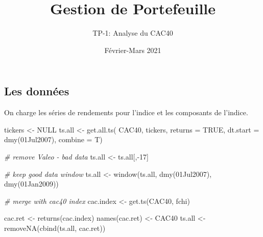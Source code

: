 \documentclass[
]{article}
\title{Gestion de Portefeuille}
\subtitle{TP-1: Analyse du CAC40}
\author{}
\date{\vspace{-2.5em}Février-Mars 2021}
\newenvironment{Shaded}{\begin{snugshade}}{\end{snugshade}}
\newcommand{\AttributeTok}[1]{\textcolor[rgb]{0.77,0.63,0.00}{#1}}
\newcommand{\CommentTok}[1]{\textcolor[rgb]{0.56,0.35,0.01}{\textit{#1}}}
\newcommand{\ConstantTok}[1]{\textcolor[rgb]{0.00,0.00,0.00}{#1}}
\newcommand{\DecValTok}[1]{\textcolor[rgb]{0.00,0.00,0.81}{#1}}
\newcommand{\FunctionTok}[1]{\textcolor[rgb]{0.00,0.00,0.00}{#1}}
\newcommand{\NormalTok}[1]{#1}
\newcommand{\OtherTok}[1]{\textcolor[rgb]{0.56,0.35,0.01}{#1}}
\newcommand{\SpecialCharTok}[1]{\textcolor[rgb]{0.00,0.00,0.00}{#1}}
\newcommand{\StringTok}[1]{\textcolor[rgb]{0.31,0.60,0.02}{#1}}
\begin{document}
\maketitle

\hypertarget{les-donnuxe9es}{%
\subsection{Les données}\label{les-donnuxe9es}}

On charge les séries de rendements pour l'indice et les composants de
l'indice.

\begin{Shaded}
\begin{Highlighting}[]
\NormalTok{tickers }\OtherTok{\textless{}{-}} \ConstantTok{NULL}
\NormalTok{  ts.all }\OtherTok{\textless{}{-}} \FunctionTok{get.all.ts}\NormalTok{(}
    \StringTok{\textquotesingle{}CAC40\textquotesingle{}}\NormalTok{, tickers, }\AttributeTok{returns =} \ConstantTok{TRUE}\NormalTok{,}
    \AttributeTok{dt.start =} \FunctionTok{dmy}\NormalTok{(}\StringTok{\textquotesingle{}01Jul2007\textquotesingle{}}\NormalTok{), }\AttributeTok{combine =}\NormalTok{ T)}
  
  \CommentTok{\# remove Valeo {-} bad data}
\NormalTok{  ts.all }\OtherTok{\textless{}{-}}\NormalTok{ ts.all[,}\SpecialCharTok{{-}}\DecValTok{17}\NormalTok{]}
  
  \CommentTok{\# keep good data window}
\NormalTok{  ts.all }\OtherTok{\textless{}{-}} \FunctionTok{window}\NormalTok{(ts.all, }\FunctionTok{dmy}\NormalTok{(}\StringTok{\textquotesingle{}01Jul2007\textquotesingle{}}\NormalTok{), }
                   \FunctionTok{dmy}\NormalTok{(}\StringTok{\textquotesingle{}01Jan2009\textquotesingle{}}\NormalTok{))}
  
  \CommentTok{\# merge with cac40 index}
\NormalTok{  cac.index }\OtherTok{\textless{}{-}} \FunctionTok{get.ts}\NormalTok{(}\StringTok{\textquotesingle{}CAC40\textquotesingle{}}\NormalTok{, }\StringTok{\textquotesingle{}fchi\textquotesingle{}}\NormalTok{)}

\NormalTok{  cac.ret }\OtherTok{\textless{}{-}} \FunctionTok{returns}\NormalTok{(cac.index)}
  \FunctionTok{names}\NormalTok{(cac.ret) }\OtherTok{\textless{}{-}} \StringTok{\textquotesingle{}CAC40\textquotesingle{}}
\NormalTok{  ts.all }\OtherTok{\textless{}{-}} \FunctionTok{removeNA}\NormalTok{(}\FunctionTok{cbind}\NormalTok{(ts.all, cac.ret))}
\end{Highlighting}
\end{Shaded}
\end{document}
